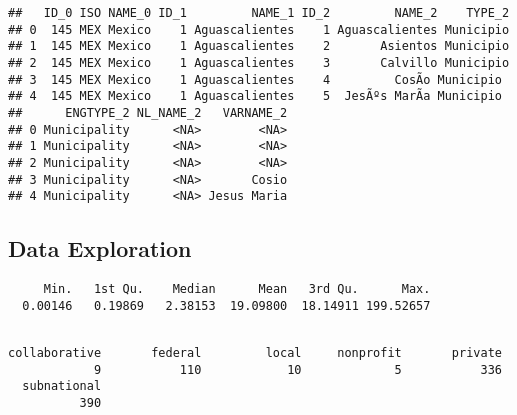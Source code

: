 \documentclass[
]{article}
\begin{document}
\begin{verbatim}
##   ID_0 ISO NAME_0 ID_1         NAME_1 ID_2         NAME_2    TYPE_2
## 0  145 MEX Mexico    1 Aguascalientes    1 Aguascalientes Municipio
## 1  145 MEX Mexico    1 Aguascalientes    2       Asientos Municipio
## 2  145 MEX Mexico    1 Aguascalientes    3       Calvillo Municipio
## 3  145 MEX Mexico    1 Aguascalientes    4         CosÃ­o Municipio
## 4  145 MEX Mexico    1 Aguascalientes    5  JesÃºs MarÃ­a Municipio
##      ENGTYPE_2 NL_NAME_2   VARNAME_2
## 0 Municipality      <NA>        <NA>
## 1 Municipality      <NA>        <NA>
## 2 Municipality      <NA>        <NA>
## 3 Municipality      <NA>       Cosio
## 4 Municipality      <NA> Jesus Maria
\end{verbatim}

\hypertarget{data-exploration}{%
\subsection{Data Exploration}\label{data-exploration}}

\begin{verbatim}
     Min.   1st Qu.    Median      Mean   3rd Qu.      Max. 
  0.00146   0.19869   2.38153  19.09800  18.14911 199.52657 
\end{verbatim}

\begin{verbatim}

collaborative       federal         local     nonprofit       private 
            9           110            10             5           336 
  subnational 
          390 
\end{verbatim}
\end{document}
